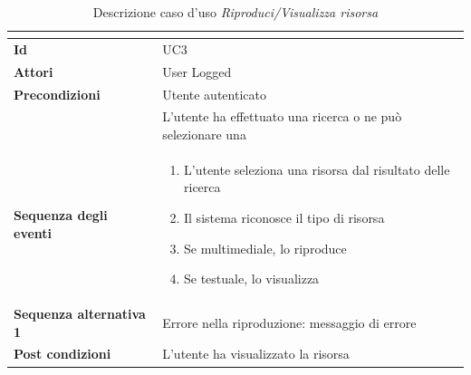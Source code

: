 \documentclass[a4paper]{article}
\begin{document}
\begin{table}[H]
    \centering
    \renewcommand{\arraystretch}{1.5}
    \begin{tabular}{|>{\bfseries}l|p{10cm}|}
        \hline
        \multicolumn{2}{|c|}{\textbf{Caso d'uso: Riproduci/Visualizza risorsa}} \\
        \hline
        \textbf{Id} & UC3 \\ \hline
        \textbf{Attori} & User Logged \\ \hline
        \textbf{Precondizioni} &
        Utente autenticato \\& L'utente ha effettuato una ricerca o ne può selezionare una
        \\ \hline
        \textbf{Sequenza degli eventi} &
        \begin{enumerate}
            \item L'utente seleziona una risorsa dal risultato delle ricerca
            \item Il sistema riconosce il tipo di risorsa
            \item Se multimediale, lo riproduce
            \item Se testuale, lo visualizza
        \end{enumerate}\\ \hline
        \textbf{Sequenza alternativa 1} & Errore nella riproduzione: messaggio di errore \\ \hline
        \textbf{Post condizioni} & L'utente ha visualizzato la risorsa \\ \hline
    \end{tabular}
    \caption{Descrizione caso d'uso \textit{Riproduci/Visualizza risorsa}}
    \label{tab:play_view_resource-usecase}
\end{table}
\end{document}
